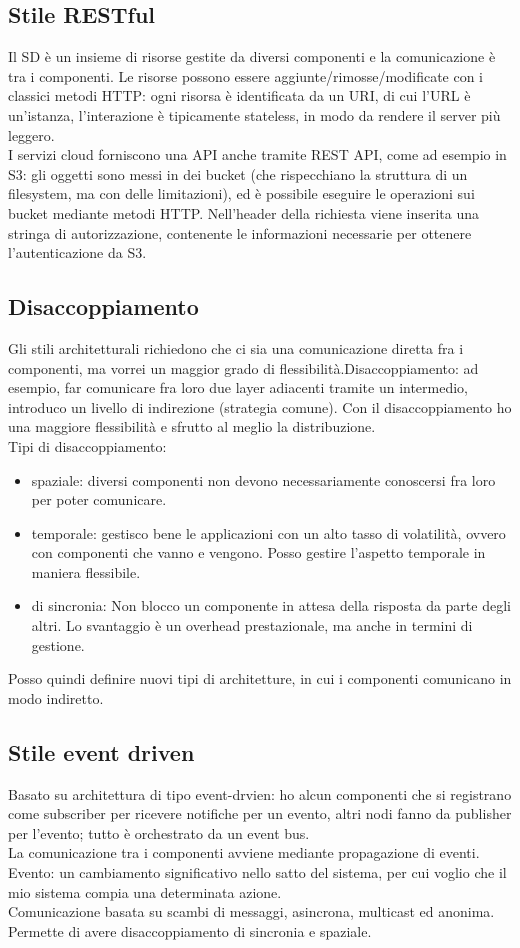 \documentclass{article}
\begin{document}
\subsection{Stile RESTful}
Il SD è un insieme di risorse gestite da diversi componenti e la comunicazione è tra i componenti. Le risorse possono essere aggiunte/rimosse/modificate con i classici metodi HTTP: ogni risorsa è identificata da un URI, di cui l'URL è un'istanza, l'interazione è tipicamente stateless, in modo da rendere il server più leggero.\\ I servizi cloud forniscono una API anche tramite REST API, come ad esempio in S3: gli oggetti sono messi in dei bucket (che rispecchiano la struttura di un filesystem, ma con delle limitazioni), ed è possibile eseguire le operazioni sui bucket mediante metodi HTTP. Nell'header della richiesta viene inserita una stringa di autorizzazione, contenente le informazioni necessarie per ottenere l'autenticazione da S3.
\subsection{Disaccoppiamento}
Gli stili architetturali richiedono che ci sia una comunicazione diretta fra i componenti, ma vorrei un maggior grado di flessibilità.Disaccoppiamento: ad esempio, far comunicare fra loro due layer adiacenti tramite un intermedio, introduco un livello di indirezione (strategia comune). Con il disaccoppiamento ho una maggiore flessibilità e sfrutto al meglio la distribuzione.\\ Tipi di disaccoppiamento:
\begin{itemize}
\item spaziale: diversi componenti non devono necessariamente conoscersi fra loro per poter comunicare.
\item temporale: gestisco bene le applicazioni con un alto tasso di volatilità, ovvero con componenti che vanno e vengono. Posso gestire l'aspetto temporale in maniera flessibile.
\item di sincronia: Non blocco un componente in attesa della risposta da parte degli altri.
Lo svantaggio è un overhead prestazionale, ma anche in termini di gestione.
\end{itemize}
Posso quindi definire nuovi tipi di architetture, in cui i componenti comunicano in modo indiretto.
\subsection{Stile event driven}
Basato su architettura di tipo event-drvien: ho alcun componenti che si registrano come subscriber per ricevere notifiche per un evento, altri nodi fanno da publisher per l'evento; tutto è orchestrato da un event bus.\\ La comunicazione tra i componenti avviene mediante propagazione di eventi. Evento: un cambiamento significativo nello satto del sistema, per cui voglio che il mio sistema compia una determinata azione.\\ Comunicazione basata su scambi di messaggi, asincrona, multicast ed anonima.\\ Permette di avere disaccoppiamento di sincronia e spaziale.
\end{document}

